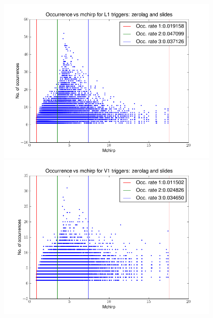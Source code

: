 \documentclass[epsf]{article}
\begin{document}
\begin{figure}[ht!]
\begin{minipage}[b]{0.7\linewidth}
\centering
\includegraphics[scale=0.55]{L1_unclustered.png}
\end{minipage}
\begin{minipage}[b]{0.7\linewidth}
\centering
\includegraphics[scale=0.55]{V1_unclustered.png}

\end{minipage}
\end{figure}
\end{document}
